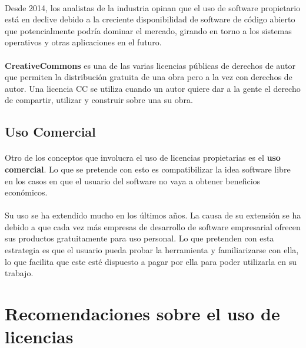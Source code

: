 \documentclass[10pt]{article}
\begin{document}
                \paragraph{}
				Desde 2014, los analistas de la industria opinan que el uso de software propietario está en declive debido a la creciente disponibilidad de software de código abierto que potencialmente podría dominar el mercado, girando en torno a los sistemas operativos y otras aplicaciones en el futuro.
                
                \paragraph{}
                \textbf{CreativeCommons} es una de las varias licencias públicas de derechos de autor que permiten la distribución gratuita de una obra pero a la vez con derechos de autor. Una licencia CC se utiliza cuando un autor quiere dar a la gente el derecho de compartir, utilizar y construir sobre una su obra.
                
		\subsection{Uso Comercial}

			\paragraph{}
			Otro de los conceptos que involucra el uso de licencias propietarias es el \textbf{uso comercial}. Lo que se pretende con esto es compatibilizar la idea software libre en los casos en que el usuario del software no vaya a obtener beneficios económicos. 
      		\paragraph{}
			Su uso se ha extendido mucho en los últimos años. La causa de su extensión se ha debido a que cada vez más empresas de desarrollo de software empresarial ofrecen sus productos gratuitamente para uso personal. Lo que pretenden con esta estrategia es que el usuario pueda probar la herramienta y familiarizarse con ella, lo que facilita que este esté dispuesto a pagar por ella para poder utilizarla en su trabajo.
                	




    \section{Recomendaciones sobre el uso de licencias}
		
\end{document}
